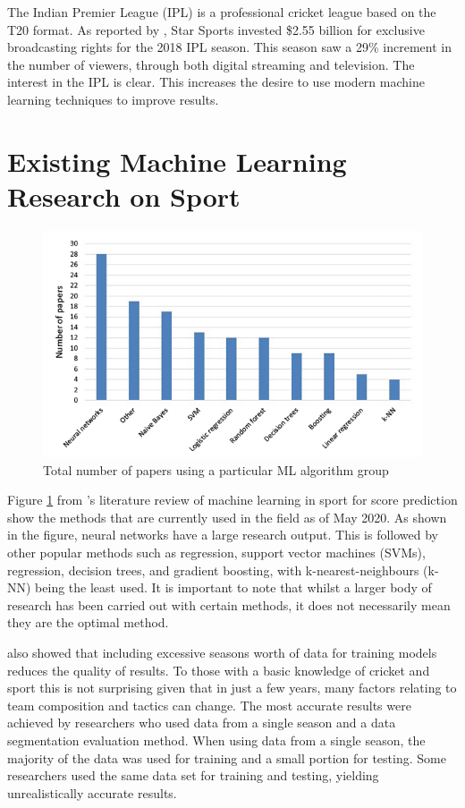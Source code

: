 \documentclass[12pt,a4paper]{report}
\theoremstyle{definition}
\begin{document}
The Indian Premier League (IPL) is a professional cricket league based on the T20 format.
As reported by \citet{ESPNcricinfo2018}, Star Sports invested \$2.55 billion for exclusive broadcasting rights for the 2018 IPL season. 
This season saw a 29\% increment in the number of viewers, through both digital streaming and television. 
The interest in the IPL is clear.
This increases the desire to use modern machine learning techniques to improve results.

\section{Existing Machine Learning Research on Sport} \label{sec:SportSurvey}

\begin{figure}[H]
    \centering
    \includegraphics[width=\linewidth]{Horvat&Job_Figure2.png}
    \caption{Total number of papers using a particular ML algorithm group \citep{horvat2020}}
    \label{fig:NoPapers}
\end{figure}

Figure \ref{fig:NoPapers} from \citet{horvat2020}'s literature review of machine learning in sport for score prediction show the methods that are currently used in the field as of May 2020. 
As shown in the figure, neural networks have a large research output.
This is followed by other popular methods such as regression, support vector machines (SVMs), regression, decision trees, and gradient boosting, with k-nearest-neighbours (k-NN) being the least used. 
It is important to note that whilst a larger body of research has been carried out with certain methods, it does not necessarily mean they are the optimal method.

\citet{horvat2020} also showed that including excessive seasons worth of data for training models reduces the quality of results. 
To those with a basic knowledge of cricket and sport this is not surprising given that in just a few years, many factors relating to team composition and tactics can change. 
The most accurate results were achieved by researchers who used data from a single season and a data segmentation evaluation method. 
When using data from a single season, the majority of the data was used for training and a small portion for testing. 
Some researchers used the same data set for training and testing, yielding unrealistically accurate results.
\end{document}
